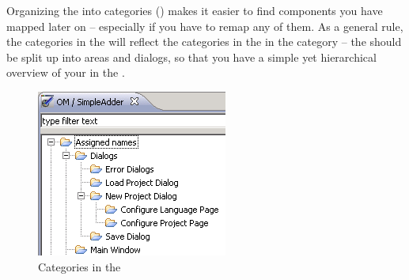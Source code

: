 Organizing the \gdomeditor{} into categories () makes it easier to find components you have mapped later on -- especially if you have to remap any of them. As a general rule, the categories in the \gdomeditor{} will reflect the categories in the \gdtestcasebrowser{} in the  category -- the \gdaut{} should be split up into areas and dialogs, so that you have a simple yet hierarchical overview of your \gdaut{} in the \gdomeditor{} . 

\begin{figure}[h]
\begin{center}
\includegraphics{BestPractices/Structure/PS/OMCats}
\caption{Categories in the \gdomeditor{}}
\label{OMCats}
\end{center}
\end{figure} 
